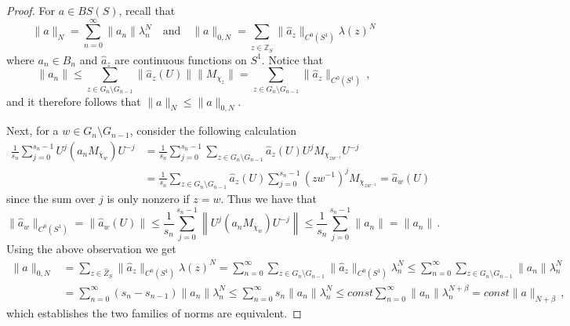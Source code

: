\documentclass[12pt,reqno]{amsart}
\numberwithin{equation}{section}
\newcommand{\Z}{{\mathbb Z}}
\begin{document}
\begin{proof}
For $a\in BS(S)$, recall that
\begin{equation*}
\|a\|_N = \sum_{n=0}^\infty\|a_n\|\lambda_n^N\quad\textrm{and}\quad \|a\|_{0,N}=\sum_{z\in\widehat{\Z}_S}\|\hat{a}_z\|_{C^0(S^1)}\lambda(z)^N
\end{equation*}
where $a_n\in B_n$ and $\hat{a}_z$ are continuous functions on $S^1$.  Notice that
\begin{equation*}
\|a_n\|\le \sum_{z\in G_n\setminus G_{n-1}}\|\hat{a}_z(U)\|\|M_{\chi_z}\| = \sum_{z\in G_n\setminus G_{n-1}}\|\hat{a}_z\|_{C^0(S^1)}\,,
\end{equation*}
and it therefore follows that $\|a\|_N\le \|a\|_{0,N}$.  

Next, for a $w\in G_n\setminus G_{n-1}$, consider the following calculation
\begin{equation*}
\begin{aligned}
\frac{1}{s_n}\sum_{j=0}^{s_n-1}U^j(a_nM_{\overline{\chi}_w})U^{-j} &= \frac{1}{s_n}\sum_{j=0}^{s_n-1}\sum_{z\in G_n\setminus G_{n-1}}\hat{a}_z(U)U^jM_{\chi_{zw^{-1}}}U^{-j}\\
&=\frac{1}{s_n}\sum_{z\in G_n\setminus G_{n-1}}\hat{a}_z(U)\sum_{j=0}^{s_n-1}(zw^{-1})^jM_{\chi_{zw^{-1}}} =\hat{a}_w(U)
\end{aligned}
\end{equation*}
since the sum over $j$ is only nonzero if $z=w$.  Thus we have that
\begin{equation*}
\|\hat{a}_w\|_{C^0(S^1)}=\|\hat{a}_w(U)\|\le\frac{1}{s_n}\sum_{j=0}^{s_n-1}\left\|U^j(a_nM_{\overline{\chi}_w})U^{-j}\right\|\le \frac{1}{s_n}\sum_{j=0}^{s_n-1}\|a_n\| =\|a_n\|\,.
\end{equation*}
Using the above observation we get
\begin{equation*}
\begin{aligned}
\|a\|_{0,N}&=\sum_{z\in\widehat{Z}_S}\|\hat{a}_z\|_{C^0(S^1)}\lambda(z)^N =\sum_{n=0}^\infty\sum_{z\in G_n\setminus G_{n-1}}\|\hat{a}_z\|_{C^0(S^1)}\lambda_n^N
\le \sum_{n=0}^\infty\sum_{z\in G_n\setminus G_{n-1}}\|a_n\|\lambda_n^N \\
&= \sum_{n=0}^\infty(s_n-s_{n-1})\|a_n\|\lambda_n^N\le \sum_{n=0}^\infty s_n\|a_n\|\lambda_n^N \le const \sum_{n=0}^\infty \|a_n\|\lambda_n^{N+\beta} = const\|a\|_{N+\beta}\,,
\end{aligned}
\end{equation*}
which establishes the two families of norms are equivalent.
\end{proof}
\end{document}
